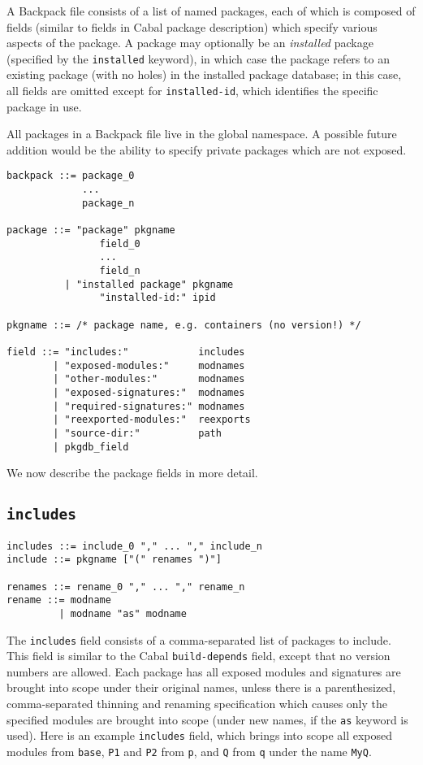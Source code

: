 \documentclass{article}
\newcommand{\Red}[1]{{\color{red} #1}}
\begin{document}
A Backpack file consists of a list of named packages, each of which
is composed of fields (similar to fields in Cabal package description)
which specify various aspects of the package.  A package may optionally
be an \emph{installed} package (specified by the \texttt{installed}
keyword), in which case the package refers to an existing package
(with no holes) in the installed package database; in this case,
all fields are omitted except for \texttt{installed-id}, which identifies the
specific package in use.

All packages in a Backpack file live in the global namespace.
\Red{A possible future addition would be the ability to specify private
packages which are not exposed.}

\begin{verbatim}
backpack ::= package_0
             ...
             package_n

package ::= "package" pkgname
                field_0
                ...
                field_n
          | "installed package" pkgname
                "installed-id:" ipid

pkgname ::= /* package name, e.g. containers (no version!) */

field ::= "includes:"            includes
        | "exposed-modules:"     modnames
        | "other-modules:"       modnames
        | "exposed-signatures:"  modnames
        | "required-signatures:" modnames
        | "reexported-modules:"  reexports
        | "source-dir:"          path
        | pkgdb_field
\end{verbatim}

We now describe the package fields in more detail.

\subsection{\texttt{includes}}

\begin{verbatim}
includes ::= include_0 "," ... "," include_n
include ::= pkgname ["(" renames ")"]

renames ::= rename_0 "," ... "," rename_n
rename ::= modname
         | modname "as" modname
\end{verbatim}

The \texttt{includes} field consists of a comma-separated list of
packages to include.  This field is similar to the Cabal
\texttt{build-depends} field, except that no version numbers are
allowed.  Each package has all exposed modules and signatures are
brought into scope under their original names, unless there is a
parenthesized, comma-separated thinning and renaming specification which
causes only the specified modules are brought into scope (under new
names, if the \texttt{as} keyword is used).  Here is an example
\texttt{includes} field, which brings into scope all exposed modules
from \texttt{base}, \texttt{P1} and \texttt{P2} from \texttt{p}, and
\texttt{Q} from \texttt{q} under the name \texttt{MyQ}.
\end{document}
